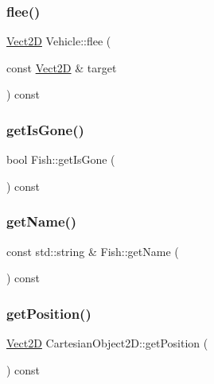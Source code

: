 \subsubsection{\texorpdfstring{flee()}{flee()}}
{\footnotesize\ttfamily \hyperlink{classVect2D}{Vect2D} Vehicle\+::flee (\begin{DoxyParamCaption}\item[{const \hyperlink{classVect2D}{Vect2D} \&}]{target }\end{DoxyParamCaption}) const\hspace{0.3cm}{\ttfamily [inherited]}}

\mbox{\label{classFish_a64e050916c0094ac377b8ec0d86a000b_a64e050916c0094ac377b8ec0d86a000b}} 
\subsubsection{\texorpdfstring{get\+Is\+Gone()}{getIsGone()}}
{\footnotesize\ttfamily bool Fish\+::get\+Is\+Gone (\begin{DoxyParamCaption}{ }\end{DoxyParamCaption}) const}

\mbox{\label{classFish_a96583314997aab0826f1c595f7d58938_a96583314997aab0826f1c595f7d58938}} 
\subsubsection{\texorpdfstring{get\+Name()}{getName()}}
{\footnotesize\ttfamily const std\+::string \& Fish\+::get\+Name (\begin{DoxyParamCaption}{ }\end{DoxyParamCaption}) const}

\mbox{\label{classCartesianObject2D_aa3a6b63777852ab9eb9408ed2536abe2_aa3a6b63777852ab9eb9408ed2536abe2}} 
\subsubsection{\texorpdfstring{get\+Position()}{getPosition()}}
{\footnotesize\ttfamily \hyperlink{classVect2D}{Vect2D} Cartesian\+Object2\+D\+::get\+Position (\begin{DoxyParamCaption}{ }\end{DoxyParamCaption}) const\hspace{0.3cm}{\ttfamily [inherited]}}

